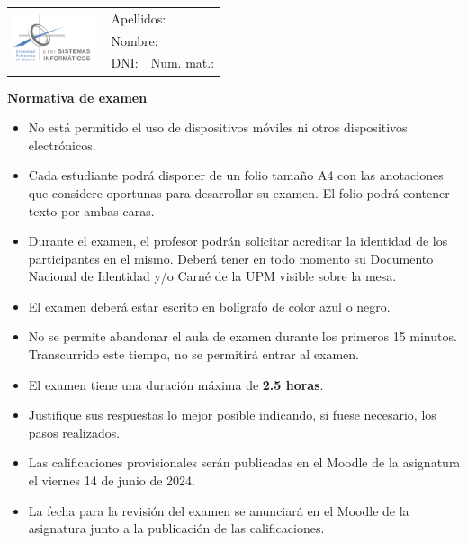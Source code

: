 \documentclass[12pt,a4paper,addpoints,answers]{exam}
\begin{document}
\begin{table}[t]
\renewcommand{\arraystretch}{1.2}
\small
\centering
\begin{tabular}{|l|p{5.5cm}|p{}|}
\hline
\multirow{3}{*}{\includegraphics[width=2.5cm]{logos/etsisi}} & \multicolumn{2}{l|}{Apellidos:} \\ \cline{2-3} 
                  & \multicolumn{2}{l|}{Nombre:}    \\ \cline{2-3} 
                  & DNI:  & Num. mat.: \\ \hline
\end{tabular}%
\label{tab:datos}
\end{table}


\begin{center}\textbf{Normativa de examen}\end{center}
\begin{itemize}
    \item No está permitido el uso de dispositivos móviles ni otros dispositivos electrónicos.
    \item Cada estudiante podrá disponer de un folio tamaño A4 con las anotaciones que considere oportunas para desarrollar su examen. El folio podrá contener texto por ambas caras.
    \item Durante el examen, el profesor podrán solicitar acreditar la identidad de los participantes en el mismo. Deberá tener en todo momento su Documento Nacional de Identidad y/o Carné de la UPM visible sobre la mesa.
    \item El examen deberá estar escrito en bolígrafo de color azul o negro.
    \item No se permite abandonar el aula de examen durante los primeros 15 minutos. Transcurrido este tiempo, no se permitirá entrar al examen. 
    \item El examen tiene una duración máxima de \textbf{2.5 horas}. 
    \item Justifique sus respuestas lo mejor posible indicando, si fuese necesario, los pasos realizados.
    \item Las calificaciones provisionales serán publicadas en el Moodle de la asignatura el viernes 14 de junio de 2024.
    \item La fecha para la revisión del examen se anunciará en el Moodle de la asignatura junto a la publicación de las calificaciones.
\end{itemize}
\end{document}
